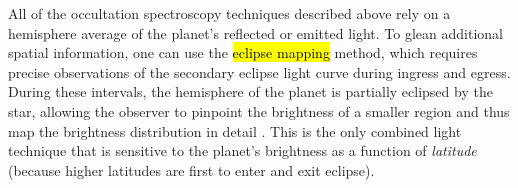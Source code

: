 \documentclass[graybox,natbib,nosecnum]{svmult}
\newcommand{\hbindex}[1]{\hl{#1}\index{#1}}  %
\newcommand{\project}[1]{\textsl{#1}}
\newcommand{\HST}{\project{HST}}
\newcommand{\Spitzer}{\project{Spitzer}}
\begin{document}
All of the occultation spectroscopy techniques described above rely on a hemisphere average of the planet's reflected or emitted light. To glean additional spatial information, one can use the \hbindex{eclipse mapping} method, which requires precise observations of the secondary eclipse light curve during ingress and egress.  During these intervals, the hemisphere of the planet is partially eclipsed by the star, allowing the observer to pinpoint the brightness of a smaller region and thus map the brightness distribution in detail \citep{rauscher07}.  This is the only combined light technique that is sensitive to the planet's brightness as a function of \emph{latitude} (because higher latitudes are first to enter and exit eclipse).




\end{document}
